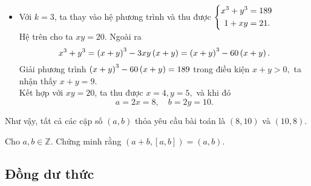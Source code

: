 \begin{bx}
{\begin{enumerate}[a,]
\begin{itemize}
   \item{} Với $k=3$, ta thay vào hệ phương trình và thu được
$\left\{\begin{aligned}x^3+y^3&=189\\1+xy&=21.\end{aligned}\right.$\\
Hệ trên cho ta $xy=20.$ Ngoài ra 
$$x^3+y^3=\left(\displaystyle x+y \right)^3-3xy\left(\displaystyle x+y \right)=\left(\displaystyle x+y \right)^3-60\left(\displaystyle x+y \right).$$
Giải phương trình
$\left(\displaystyle x+y \right)^3-60\left(\displaystyle x+y \right)=189$
trong điều kiện $x+y>0,$ ta nhận thấy $x+y=9$.\\ Kết hợp với $xy=20$, ta thu được
$x=4, y=5,$ và khi đó
$$a=2x=8,\quad b=2y=10.$$
\end{itemize}
Như vậy, tất cả các cặp số $(a,b)$ thỏa yêu cầu bài toán là $(8,10)$ và $(10,8).$
\end{enumerate}}


\end{bx}
\begin{bx}
Cho $a, b \in \mathbb{Z}$. Chứng minh rằng $(a+b,[a, b])=(a, b)$.
\end{bx}

\subsection{Đồng dư thức}

